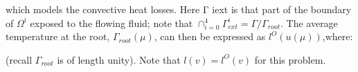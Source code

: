which models the convective heat losses. Here Γ iext is that part of the boundary of $\Omega^i$ exposed to the flowing fluid; note that $\cap_{i=0}^4 \Gamma_{ext}^i=\Gamma /\Gamma_{root}$. The average temperature at the root, $\Gamma_{root}(\mu)$, can then be expressed as $l^O(u(\mu))$,where:

(recall $\Gamma_{root}$ is of length unity). Note that $l(v)=l^O(v)$ for this problem.








































